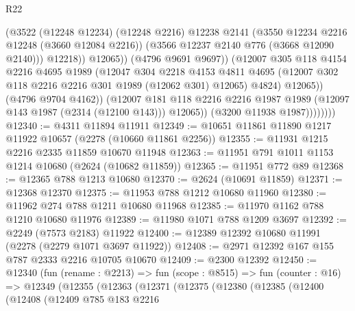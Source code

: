 \begin{lexlean}{R22}
\begin{coremodule}
                                  (@3522
                                    (@12248 @12234)
                                    (@12248 @2216)
                                    @12238
                                    @2141
                                    (@3550 @12234 @2216 @12248 (@3660 @12084 @2216))
                                    (@3566 @12237 @2140 @776 (@3668 @12090 @2140)))
                                  @12218))
                              @12065))
                          (@4796 @9691 @9697))
                        (@12007
                          @305
                          @118
                          @4154
                          @2216
                          @4695
                          @1989
                          (@12047
                            @304
                            @2218
                            @4153
                            @4811
                            @4695
                            (@12007 @302 @118 @2216 @2216 @301 @1989 (@12062 @301) @12065)
                            @4824)
                          @12065))
                      (@4796 @9704 @4162))
                    (@12007
                      @181
                      @118
                      @2216
                      @2216
                      @1987
                      @1989
                      (@12097 @143 @1987 (@2314 (@12100 @143)))
                      @12065))
                  (@3200 @11938 @1987))))))))
@12340 := @4311 @11894 @11911
@12349 := @10651 @11861 @11890 @1217 @11922 @10657 (@2278 (@10660 @11861 @2256))
@12355 := @11931 @1215 @2216 @2335 @11859 @10670 @11948
@12363 := @11951 @791 @1011 @1153 @1214 @10680 (@2624 (@10682 @11859))
@12365 := @11951 @772 @89
@12368 := @12365 @788 @1213 @10680
@12370 := @2624 (@10691 @11859)
@12371 := @12368 @12370
@12375 := @11953 @788 @1212 @10680 @11960
@12380 := @11962 @274 @788 @1211 @10680 @11968
@12385 := @11970 @1162 @788 @1210 @10680 @11976
@12389 := @11980 @1071 @788 @1209 @3697
@12392 := @2249 (@7573 @2183) @11922
@12400 := @12389 @12392 @10680 @11991 (@2278 (@2279 @1071 @3697 @11922))
@12408 := @2971 @12392 @167 @155 @787 @2333 @2216 @10705 @10670
@12409 := @2300 @12392
@12450 := @12340
    (fun (rename : @2213) =>
    fun (scope : @8515) =>
    fun (counter : @16) =>
    @12349
      (@12355
        (@12363
          (@12371
            (@12375
              (@12380
                (@12385
                  (@12400
                    (@12408
                      (@12409
                        @785
                        @183
                        @2216

\end{coremodule}
\end{lexlean}
